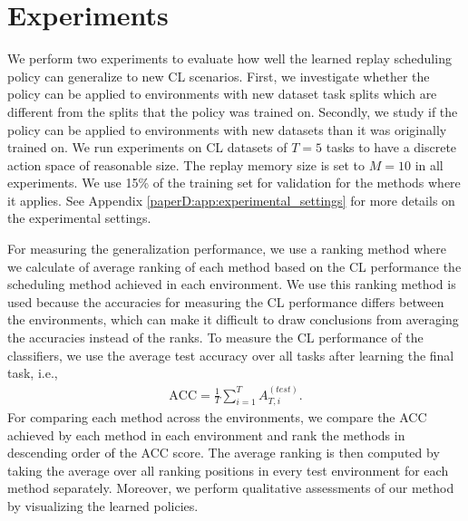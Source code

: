 
\section{Experiments}\label{paperD:sec:experiments}


We perform two experiments to evaluate how well the learned replay scheduling policy can generalize to new CL scenarios. First, we investigate whether the policy can be applied to environments with new dataset task splits which are different from the splits that the policy was trained on. Secondly, we study if the policy can be applied to environments with new datasets than it was originally trained on. 
We run experiments on CL datasets of $T=5$ tasks to have a discrete action space of reasonable size. The replay memory size is set to $M=10$ in all experiments. We use 15\% of the training set for validation for the methods where it applies. See Appendix \ref{paperD:app:experimental_settings} for more details on the experimental settings.  

For measuring the generalization performance, we use a ranking method where we calculate of average ranking of each method based on the CL performance the scheduling method achieved in each environment. We use this ranking method is used because the accuracies for measuring the CL performance differs between the environments, which can make it difficult to draw conclusions from averaging the accuracies instead of the ranks.  
To measure the CL performance of the classifiers, we use the average test accuracy over all tasks after learning the final task, i.e.,
\begin{align}
    \text{ACC} = \frac{1}{T} \sum_{i=1}^{T} A_{T, i}^{(test)}.
\end{align}
For comparing each method across the environments, we compare the ACC achieved by each method in each environment and rank the methods in descending order of the ACC score. 
The average ranking is then computed by taking the average over all ranking positions in every test environment for each method separately.  Moreover, we perform qualitative assessments of our method by visualizing the learned policies.

